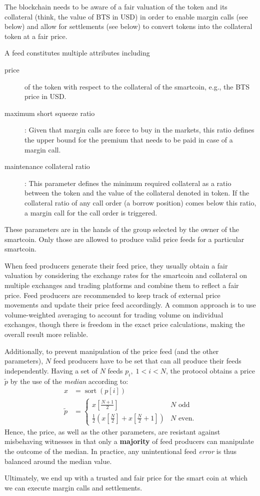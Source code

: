 \label{sec:feeds}

The blockchain needs to be aware of a fair valuation of the token and its
collateral (think, the value of BTS in USD) in order to enable margin calls
(see below) and allow for settlements (see below) to convert tokens into the
collateral token at a fair price.

A feed constitutes multiple attributes including
\begin{description}
 \item[price] of the token with respect to the collateral of the smartcoin,
  e.g., the BTS price in USD.
 \item[maximum short squeeze ratio]: Given that margin calls are force to buy
  in the markets, this ratio defines the upper bound for the premium that needs
  to be paid in case of a margin call.
 \item[maintenance collateral ratio]: This parameter defines the minimum
  required collateral as a ratio between the token and the value of the
  collateral denoted in token. If the collateral ratio of any call order (a
  borrow position) comes below this ratio, a margin call for the call order is
  triggered.
\end{description}

These parameters are in the hands of the group selected by the owner of the
smartcoin. Only those are allowed to produce valid price feeds for a particular
smartcoin. 

When feed producers generate their feed price,
they usually obtain a fair valuation by considering the exchange rates for the
smartcoin and collateral on multiple exchanges and trading platforms and combine them to
reflect a fair price. Feed producers are recommended to keep track of external price
movements and update their price feed accordingly. A common approach is to use volume-weighted 
averaging to account for trading volume on individual exchanges, though there is freedom in the exact
price calculations, making the overall result  more reliable.

Additionally, to prevent manipulation of the price feed (and the other
parameters), $N$ feed producers have to be set that can all produce their feeds
independently. Having a set of $N$ feeds $p_i,\;1<i<N$, the protocol obtains a price $\tilde{p}$ by the
use of the \emph{median} according to:
\begin{align}
 x &= \operatorname{sort}(p[i])\\
 \tilde p &=\begin{cases}
   x[\frac{N+1}{2}]                                               & N \text{ odd}\\
   \frac {1}{2}\left(x[{\frac{N}{2}}] + x[\frac{N}{2} + 1]\right) & N \text{ even.}
 \end{cases}
\end{align}
Hence, the price, as well as the other parameters, are resistant against
misbehaving witnesses in that only a \textbf{majority} of feed producers can
manipulate the outcome of the median. In practice, any unintentional feed
\emph{error} is thus balanced around the median value.

Ultimately, we end up with a trusted and fair price for the smart coin at which
we can execute margin calls and settlements.
